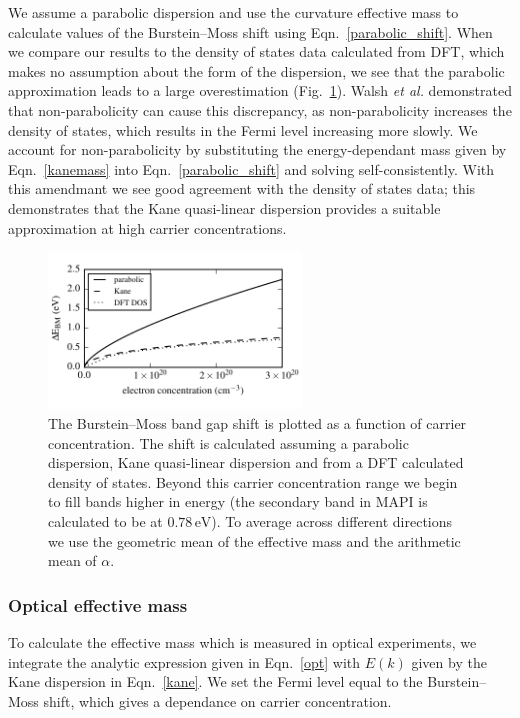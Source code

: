 We assume a parabolic dispersion and use the curvature effective mass to calculate values of the Burstein--Moss shift using Eqn.\ \ref{parabolic_shift}. When we compare our results to the density of states data calculated from DFT, which makes no assumption about the form of the dispersion, we see that the parabolic approximation leads to a large overestimation (Fig.\ \ref{burstein_moss_plot}). 
Walsh \textit{et al.}\autocite{Walsh2008} demonstrated that non-parabolicity can cause this discrepancy, as
non-parabolicity increases the density of states, which results in the Fermi level increasing more slowly. 
We account for non-parabolicity by substituting the energy-dependant mass given by Eqn.\ \ref{kanemass} into Eqn.\ \ref{parabolic_shift} and solving self-consistently.
With this amendmant we see good agreement with the density of states data; this demonstrates that the Kane quasi-linear dispersion provides a suitable approximation at high carrier concentrations.

\begin{figure}[tb] \centering
\includegraphics[width=0.6\textwidth]{./figures/ch4/burstein_moss_MAPI_hybrid_SoC.pdf}
\caption[Burstein--Moss band gap shift]{\label{burstein_moss_plot} The Burstein--Moss band gap shift is plotted as a function of carrier concentration. The shift is calculated assuming a parabolic dispersion, Kane quasi-linear dispersion and from a DFT calculated density of states. Beyond this carrier concentration range we begin to fill bands higher in energy (the secondary band in MAPI is calculated to be at $0.78\,\mathrm{eV}$). To average across different directions we use the geometric mean of the effective mass and the arithmetic mean of $\alpha$.}
\end{figure}

\subsubsection{Optical effective mass}

To calculate the effective mass which is measured in optical experiments, we integrate the analytic expression given in Eqn.\ \ref{opt} with $E(k)$ given by the Kane dispersion in Eqn.\ \ref{kane}. 
We set the Fermi level equal to the Burstein--Moss shift, which gives a dependance on carrier concentration. 

